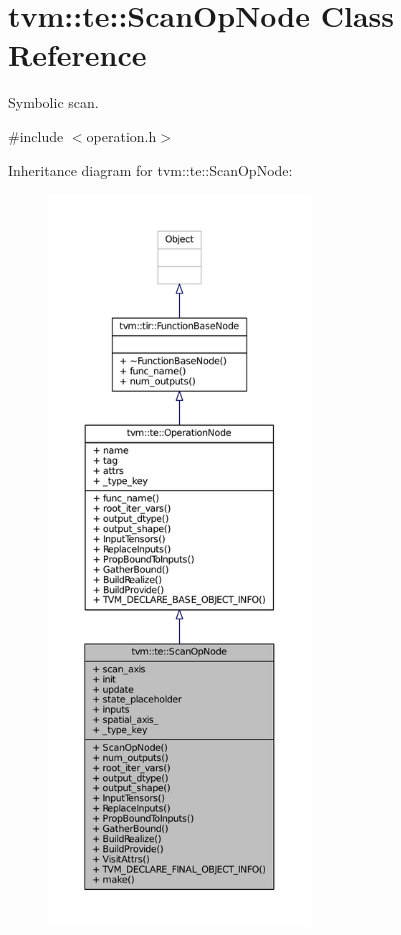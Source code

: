 \hypertarget{classtvm_1_1te_1_1ScanOpNode}{}\section{tvm\+:\+:te\+:\+:Scan\+Op\+Node Class Reference}
\label{classtvm_1_1te_1_1ScanOpNode}


Symbolic scan.  




{\ttfamily \#include $<$operation.\+h$>$}



Inheritance diagram for tvm\+:\+:te\+:\+:Scan\+Op\+Node\+:
\nopagebreak
\begin{figure}[H]
\begin{center}
\leavevmode
\includegraphics[height=550pt]{classtvm_1_1te_1_1ScanOpNode__inherit__graph}
\end{center}
\end{figure}


